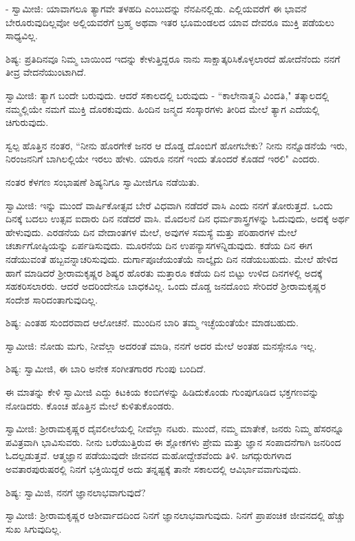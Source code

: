 - ಸ್ವಾಮೀಜಿ: ಯಾವಾಗಲೂ ತ್ಯಾಗವೇ ತಳಹದಿ ಎಂಬುದನ್ನು ನೆನಪಿನಲ್ಲಿಡು. ಎಲ್ಲಿಯವರೆಗೆ ಈ ಭಾವನೆ ಬೇರೂರುವುದಿಲ್ಲವೋ ಅಲ್ಲಿಯವರೆಗೆ ಬ್ರಹ್ಮ ಅಥವಾ ಇತರ ಭೂಮಂಡಲದ ಯಾವ ದೇವರೂ ಮುಕ್ತಿ ಪಡೆಯಲು ಸಾಧ್ಯವಿಲ್ಲ.

ಶಿಷ್ಯ: ಪ್ರತಿದಿನವೂ ನಿಮ್ಮ ಬಾಯಿಂದ ಇದನ್ನು ಕೇಳುತ್ತಿದ್ದರೂ ನಾನು ಸಾಕ್ಷಾತ್ಕರಿಸಿಕೊಳ್ಳಲಾರದೆ ಹೋದೆನೆಂದು ನನಗೆ ತೀವ್ರ ವೇದನೆಯುಂಟಾಗಿದೆ.

ಸ್ವಾಮೀಜಿ: ತ್ಯಾಗ ಬಂದೇ ಬರುವುದು. ಆದರೆ ಸಕಾಲದಲ್ಲಿ ಬರುವುದು - “ಕಾಲೇನಾತ್ಮನಿ ವಿಂದತಿ," ತತ್ಕಾಲದಲ್ಲಿ ನಮ್ಮಲ್ಲಿಯೇ ನಮಗೆ ಮುಕ್ತಿ ದೊರಕುವುದು. ಹಿಂದಿನ ಜನ್ಮದ ಸಂಸ್ಕಾರಗಳು ತೀರಿದ ಮೇಲೆ ತ್ಯಾಗ ಎದೆಯಲ್ಲಿ ಚಿಗುರುವುದು.

ಸ್ವಲ್ಪ ಹೊತ್ತಿನ ನಂತರ, “ನೀನು ಹೊರಗೇಕೆ ಜನರ ಆ ದೊಡ್ಡ ದೊಂಬಿಗೆ ಹೋಗಬೇಕು? ನೀನು ನನ್ನೊಡನೆಯೆ ಇರು, ನಿರಂಜನನಿಗೆ ಬಾಗಿಲಲ್ಲಿಯೇ ಇರಲು ಹೇಳು. ಯಾರೂ ನನಗೆ ಇಂದು ತೊಂದರೆ ಕೊಡದೆ ಇರಲಿ" ಎಂದರು.

ನಂತರ ಕೆಳಗಣ ಸಂಭಾಷಣೆ ಶಿಷ್ಯನಿಗೂ ಸ್ವಾಮೀಜಿಗೂ ನಡೆಯಿತು.

ಸ್ವಾಮೀಜಿ: ಇನ್ನು ಮುಂದೆ ವಾರ್ಷಿಕೋತ್ಸವ ಬೇರೆ ವಿಧವಾಗಿ ನಡೆದರೆ ವಾಸಿ ಎಂದು ನನಗೆ ತೋರುತ್ತದೆ. ಒಂದು ದಿನಕ್ಕೆ ಬದಲು ಉತ್ಸವ ಐದಾರು ದಿನ ನಡೆದರೆ ವಾಸಿ. ಮೊದಲನೆ ದಿನ ಧರ್ಮಶಾಸ್ತ್ರಗಳನ್ನು ಓದುವುದು, ಅದಕ್ಕೆ ಅರ್ಥ ಹೇಳುವುದು. ಎರಡನೆಯ ದಿನ ವೇದಾಂತಗಳ ಮೇಲೆ, ಅವುಗಳ ಸಮಸ್ಯೆ ಮತ್ತು ಪರಿಹಾರಗಳ ಮೇಲೆ ಚರ್ಚಾಗೋಷ್ಠಿಯನ್ನು ಏರ್ಪಡಿಸುವುದು. ಮೂರನೆಯ ದಿನ ಉಪನ್ಯಾಸಗಳನ್ನಿಡುವುದು. ಕಡೆಯ ದಿನ ಈಗ ನಡೆಯುವಂತೆ ಹಬ್ಬವನ್ನಾಚರಿಸುವುದು. ದುರ್ಗಾಪೂಜೆಯಂತೆಯೆ ನಾಲ್ಕೈದು ದಿನ ನಡೆಯಬಹುದು. ಮೇಲೆ ಹೇಳಿದ ಹಾಗೆ ಮಾಡಿದರೆ ಶ‍್ರೀರಾಮಕೃಷ್ಣರ ಶಿಷ್ಯರ ಹೊರತು ಮತ್ತಾರೂ ಕಡೆಯ ದಿನ ಬಿಟ್ಟು ಉಳಿದ ದಿನಗಳಲ್ಲಿ ಅದಕ್ಕೆ ಸಹಕರಿಸಲಾರರು. ಆದರೆ ಅದರಿಂದೇನೂ ಬಾಧಕವಿಲ್ಲ. ಒಂದು ದೊಡ್ಡ ಜನದೊಂಬಿ ಸೇರಿದರೆ ಶ‍್ರೀರಾಮಕೃಷ್ಣರ ಸಂದೇಶ ಸಾರಿದಂತಾಗುವುದಿಲ್ಲ.

ಶಿಷ್ಯ: ಎಂತಹ ಸುಂದರವಾದ ಆಲೋಚನೆ. ಮುಂದಿನ ಬಾರಿ ತಮ್ಮ ಇಚ್ಛೆಯಂತೆಯೇ ಮಾಡಬಹುದು.

ಸ್ವಾಮೀಜಿ: ನೋಡು ಮಗು, ನೀವೆಲ್ಲಾ ಅದರಂತೆ ಮಾಡಿ, ನನಗೆ ಅದರ ಮೇಲೆ ಅಂತಹ ಮನಸ್ಸೇನೂ ಇಲ್ಲ.

ಶಿಷ್ಯ: ಸ್ವಾಮೀಜಿ, ಈ ಬಾರಿ ಅನೇಕ ಸಂಗೀತಗಾರರ ಗುಂಪು ಬಂದಿದೆ.

ಈ ಮಾತನ್ನು ಕೇಳಿ ಸ್ವಾಮೀಜಿ ಎದ್ದು ಕಿಟಕಿಯ ಕಂಬಿಗಳನ್ನು ಹಿಡಿದುಕೊಂಡು ಗುಂಪುಗೂಡಿದ ಭಕ್ತಗಣವನ್ನು ನೋಡಿದರು. ಕೊಂಚ ಹೊತ್ತಿನ ಮೇಲೆ ಕುಳಿತುಕೊಂಡರು.

ಸ್ವಾಮೀಜಿ: ಶ‍್ರೀರಾಮಕೃಷ್ಣರ ದೈವಲೀಲೆಯಲ್ಲಿ ನೀವೆಲ್ಲಾ ನಟರು. ಮುಂದೆ, ನಮ್ಮ ಮಾತೇಕೆ, ಜನರು ನಿಮ್ಮ ಹೆಸರನ್ನೂ ಪವಿತ್ರವಾಗಿ ಭಾವಿಸುವರು. ನೀನು ಬರೆಯುತ್ತಿರುವ ಈ ಶ್ಲೋಕಗಳು ಪ್ರೇಮ ಮತ್ತು ಜ್ಞಾನ ಸಂಪಾದನೆಗಾಗಿ ಜನರಿಂದ ಓದಲ್ಪಡುತ್ತವೆ. ಆತ್ಮಜ್ಞಾನ ಪಡೆಯುವುದೇ ಜೀವನದ ಮಹೋದ್ದೇಶವೆಂದು ತಿಳಿ. ಜಗದ್ಗುರುಗಳಾದ ಅವತಾರಪುರುಷರಲ್ಲಿ ನಿನಗೆ ಭಕ್ತಿಯಿದ್ದರೆ ಅದು ತನ್ನಷ್ಟಕ್ಕೆ ತಾನೇ ಸಕಾಲದಲ್ಲಿ ಆವಿರ್ಭಾವವಾಗುವುದು.

ಶಿಷ್ಯ: ಸ್ವಾಮಿಜಿ, ನನಗೆ ಜ್ಞಾನಲಾಭವಾಗುವುದೆ?

ಸ್ವಾಮೀಜಿ: ಶ‍್ರೀರಾಮಕೃಷ್ಣರ ಆಶೀರ್ವಾದದಿಂದ ನಿನಗೆ ಜ್ಞಾನಲಾಭವಾಗುವುದು. ನಿನಗೆ ಪ್ರಾಪಂಚಿಕ ಜೀವನದಲ್ಲಿ ಹೆಚ್ಚು ಸುಖ ಸಿಗುವುದಿಲ್ಲ.

